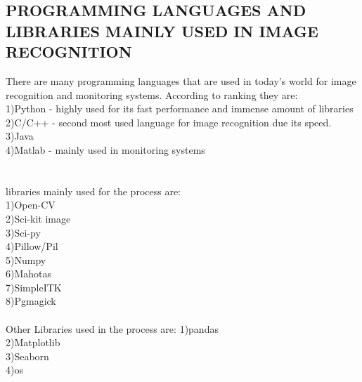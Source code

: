 \documentclass[12pt,letterpaper, onecolumn]{exam}
\begin{document}
  \subsection{PROGRAMMING LANGUAGES AND LIBRARIES MAINLY USED IN IMAGE RECOGNITION}
  There are many programming languages that are used in today's world for image recognition and monitoring systems. According to ranking they are:\\
  1)Python - highly used for its fast performance and immense amount of libraries\\
  2)C/C++ - second most used language for image recognition due its speed.\\
  3)Java \\
  4)Matlab - mainly used in monitoring systems\\
  \\\\
  libraries mainly used for the process are:\\
  1)Open-CV\\
  2)Sci-kit image\\
  3)Sci-py\\
  4)Pillow/Pil\\
  5)Numpy\\
  6)Mahotas\\
  7)SimpleITK\\
  8)Pgmagick\\
  \\
  Other Libraries used in the process are:
  1)pandas\\
  2)Matplotlib\\
  3)Seaborn\\
  4)os
  
    
\end{document}
